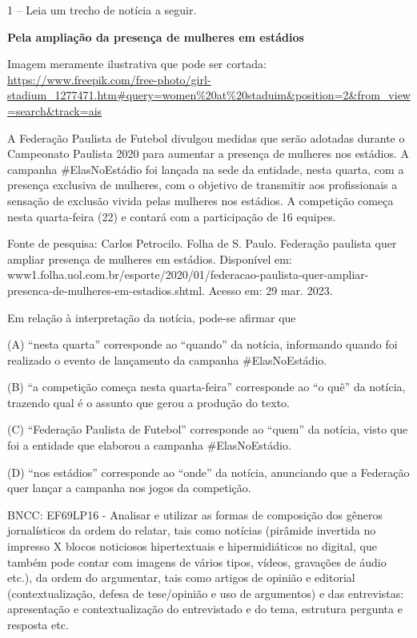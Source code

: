 \begin{itemize}
1 -- Leia um trecho de notícia a seguir.

\textbf{Pela ampliação da presença de mulheres em estádios}

Imagem meramente ilustrativa que pode ser cortada:
\url{https://www.freepik.com/free-photo/girl-stadium_1277471.htm\#query=women\%20at\%20staduim\&position=2\&from_view=search\&track=ais}

A Federação Paulista de Futebol divulgou medidas que serão adotadas
durante o Campeonato Paulista 2020 para aumentar a presença de mulheres
nos estádios. A campanha \#ElasNoEstádio foi lançada na sede da
entidade, nesta quarta, com a presença exclusiva de mulheres, com o
objetivo de transmitir aos profissionais a sensação de exclusão vivida
pelas mulheres nos estádios. A competição começa nesta quarta-feira (22)
e contará com a participação de 16 equipes.

Fonte de pesquisa: Carlos Petrocilo. Folha de S. Paulo. Federação
paulista quer ampliar presença de mulheres em estádios. Disponível em:
www1.folha.uol.com.br/esporte/2020/01/federacao-paulista-quer-ampliar-presenca-de-mulheres-em-estadios.shtml.
Acesso em: 29 mar. 2023.

Em relação à interpretação da notícia, pode-se afirmar que

(A) ``nesta quarta'' corresponde ao ``quando'' da notícia, informando
quando foi realizado o evento de lançamento da campanha \#ElasNoEstádio.

(B) ``a competição começa nesta quarta-feira'' corresponde ao ``o quê''
da notícia, trazendo qual é o assunto que gerou a produção do texto.

(C) ``Federação Paulista de Futebol'' corresponde ao ``quem'' da
notícia, visto que foi a entidade que elaborou a campanha
\#ElasNoEstádio.

(D) ``nos estádios'' corresponde ao ``onde'' da notícia, anunciando que
a Federação quer lançar a campanha nos jogos da competição.

BNCC: EF69LP16 - Analisar e utilizar as formas de composição dos gêneros
jornalísticos da ordem do relatar, tais como notícias (pirâmide
invertida no impresso X blocos noticiosos hipertextuais e
hipermidiáticos no digital, que também pode contar com imagens de vários
tipos, vídeos, gravações de áudio etc.), da ordem do argumentar, tais
como artigos de opinião e editorial (contextualização, defesa de
tese/opinião e uso de argumentos) e das entrevistas: apresentação e
contextualização do entrevistado e do tema, estrutura pergunta e
resposta etc.


\end{itemize}
